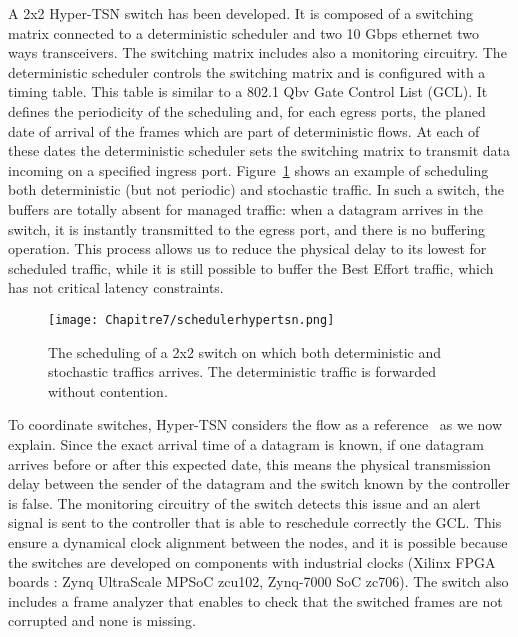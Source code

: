 A 2x2 Hyper-TSN switch has been developed. It is composed of a switching matrix connected to a deterministic scheduler and two 10 Gbps ethernet two ways transceivers. The switching matrix includes also a monitoring circuitry. The deterministic scheduler controls the switching matrix and is configured with a timing table. This table is similar to a 802.1 Qbv Gate Control List (GCL). It defines the periodicity of the scheduling and, for each egress ports, the planed date of arrival of the frames which are part of deterministic flows. At each of these dates the deterministic scheduler sets the switching matrix to transmit data incoming on a specified ingress port. Figure~\ref{fig:schedulehtsn} shows an example of scheduling both deterministic (but not periodic) and stochastic traffic.
 In such a switch, the buffers are totally absent for managed traffic: when a datagram arrives in the switch, it is instantly transmitted to the egress port, and there is no buffering operation. This process allows us to reduce the physical delay to its lowest for scheduled traffic, while it is still possible to buffer the Best Effort traffic, which has not critical latency constraints.
\begin{center}

\begin{figure}[h]
  \centering
\texttt{[image: Chapitre7/schedulerhypertsn.png]}
\caption{ The scheduling of a 2x2 switch on which both deterministic and stochastic traffics arrives. The deterministic traffic is forwarded without contention.}
\label{fig:schedulehtsn}
\end{figure}
\end{center}

To coordinate switches, Hyper-TSN considers the flow as a reference~\cite{leclerc2020optical} as we now explain. Since the exact arrival time of a datagram is known, if one datagram arrives before or after this expected date, this means the physical transmission delay between the sender of the datagram and the switch known by the controller is false. The monitoring circuitry of the switch detects this issue and an alert signal is sent to the controller that is able to reschedule correctly the GCL.
This ensure a dynamical clock alignment between the nodes, and it is possible because the switches are developed on components with industrial clocks (Xilinx FPGA boards : Zynq UltraScale MPSoC zcu102, Zynq-7000 SoC zc706). 
The switch also includes a frame analyzer that enables to check that the switched frames are not corrupted and none is missing.


